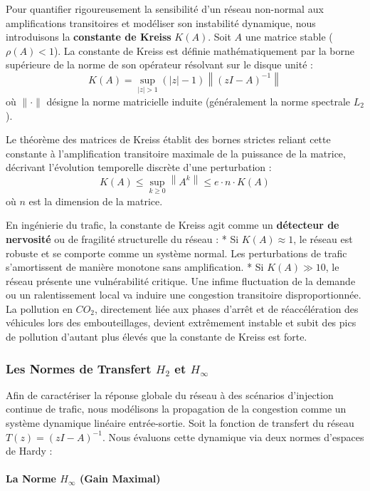 \documentclass[10pt, a4paper]{article}
\begin{document}
Pour quantifier rigoureusement la sensibilité d'un réseau non-normal aux
amplifications transitoires et modéliser son instabilité dynamique, nous
introduisons la \textbf{constante de Kreiss} \(K(A)\). Soit \(A\) une
matrice stable (\(\rho(A) < 1\)). La constante de Kreiss est définie
mathématiquement par la borne supérieure de la norme de son opérateur
résolvant sur le disque unité :
\[K(A) = \sup_{|z| > 1} (|z| - 1) \left\| (zI - A)^{-1} \right\|\] où
\(\|\cdot\|\) désigne la norme matricielle induite (généralement la
norme spectrale \(L_2\)).

Le théorème des matrices de Kreiss établit des bornes strictes reliant
cette constante à l'amplification transitoire maximale de la puissance
de la matrice, décrivant l'évolution temporelle discrète d'une
perturbation :
\[K(A) \le \sup_{k \ge 0} \left\| A^k \right\| \le e \cdot n \cdot K(A)\]
où \(n\) est la dimension de la matrice.

En ingénierie du trafic, la constante de Kreiss agit comme un
\textbf{détecteur de nervosité} ou de fragilité structurelle du réseau :
* Si \(K(A) \approx 1\), le réseau est robuste et se comporte comme un
système normal. Les perturbations de trafic s'amortissent de manière
monotone sans amplification. * Si \(K(A) \gg 10\), le réseau présente
une vulnérabilité critique. Une infime fluctuation de la demande ou un
ralentissement local va induire une congestion transitoire
disproportionnée. La pollution en \(CO_2\), directement liée aux phases
d'arrêt et de réaccélération des véhicules lors des embouteillages,
devient extrêmement instable et subit des pics de pollution d'autant
plus élevés que la constante de Kreiss est forte.

\subsubsection{\texorpdfstring{Les Normes de Transfert \(H_2\) et
\(H_\infty\)}{Les Normes de Transfert H\_2 et H\_\textbackslash infty}}\label{les-normes-de-transfert-h_2-et-h_infty}

Afin de caractériser la réponse globale du réseau à des scénarios
d'injection continue de trafic, nous modélisons la propagation de la
congestion comme un système dynamique linéaire entrée-sortie. Soit la
fonction de transfert du réseau \(T(z) = (zI - A)^{-1}\). Nous évaluons
cette dynamique via deux normes d'espaces de Hardy :

\paragraph{\texorpdfstring{La Norme \(H_\infty\) (Gain
Maximal)}{La Norme H\_\textbackslash infty (Gain Maximal)}}\label{la-norme-h_infty-gain-maximal}
\end{document}
